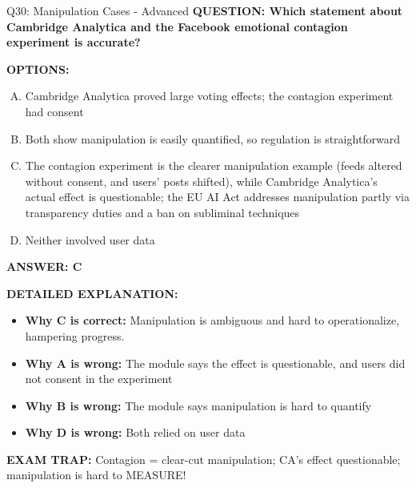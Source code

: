 \documentclass[8pt]{beamer}
\begin{document}
\begin{frame}[shrink=6]{Q30: Manipulation Cases - Advanced}
\fontsize{6.5}{7.5}\selectfont
\textbf{QUESTION: Which statement about Cambridge Analytica and the Facebook emotional contagion experiment is accurate?}

\vspace{0.1cm}
\textbf{OPTIONS:}
\begin{enumerate}[A.]
\item Cambridge Analytica proved large voting effects; the contagion experiment had consent
\item Both show manipulation is easily quantified, so regulation is straightforward
\item The contagion experiment is the clearer manipulation example (feeds altered without consent, and users' posts shifted), while Cambridge Analytica's actual effect is questionable; the EU AI Act addresses manipulation partly via transparency duties and a ban on subliminal techniques
\item Neither involved user data
\end{enumerate}

\vspace{0.1cm}
\textcolor{myblue}{\textbf{ANSWER: C}}

\vspace{0.1cm}
\textbf{DETAILED EXPLANATION:}
\begin{itemize}
\item \textbf{Why C is correct:} Manipulation is ambiguous and hard to operationalize, hampering progress.
\item \textbf{Why A is wrong:} The module says the effect is questionable, and users did not consent in the experiment
\item \textbf{Why B is wrong:} The module says manipulation is hard to quantify
\item \textbf{Why D is wrong:} Both relied on user data
\end{itemize}

\textcolor{myred}{\textbf{EXAM TRAP:}} Contagion = clear-cut manipulation; CA's effect questionable; manipulation is hard to MEASURE!
\end{frame}
\end{document}

